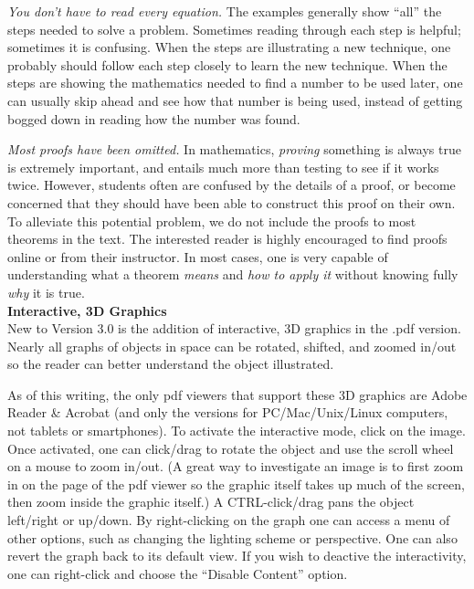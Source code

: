 \textit{You don't have to read every equation.} The examples generally show ``all'' the steps needed to solve a problem. Sometimes reading through each step is helpful; sometimes it is confusing. When the steps are illustrating a new technique, one probably should follow each step closely to learn the new technique. When the steps are showing the mathematics needed to find a number to be used later, one can usually skip ahead and see how that number is being used, instead of getting bogged down in reading how the number was found.

\textit{Most proofs have been omitted.} In mathematics, \textit{proving} something is always true is extremely important, and entails much more than testing to see if it works twice. However, students often are confused by the details of a proof, or become concerned that they should have been able to construct this proof on their own. To alleviate this potential problem, we do not include the proofs to most theorems in the text. The interested reader is highly encouraged to find proofs online or from their instructor. In most cases, one is very capable of understanding what a theorem \textit{means} and \textit{how to apply it} without knowing fully \textit{why} it is true.
\\

\thispagestyle{empty}
\noindent\textbf{\large Interactive, 3D Graphics}\\

New to Version 3.0 is the addition of interactive, 3D graphics in the .pdf version. Nearly all graphs of objects in space can be rotated, shifted, and zoomed in/out so the reader can better understand the object illustrated. 

As of this writing, the only pdf viewers that support these 3D graphics are Adobe Reader \& Acrobat (and only the versions for PC/Mac/Unix/Linux computers, not tablets or smartphones). To activate the interactive mode, click on the image. Once activated, one can click/drag to rotate the object and use the scroll wheel on a mouse to zoom in/out. (A great way to investigate an image is to first zoom in on the page of the pdf viewer so the graphic itself takes up much of the screen, then zoom inside the graphic itself.) A CTRL-click/drag pans the object left/right or up/down. By right-clicking on the graph one can access a menu of other options, such as changing the lighting scheme or perspective. One can also revert the graph back to its default view. If you wish to deactive the interactivity, one can right-click and choose the ``Disable Content'' option. \\

